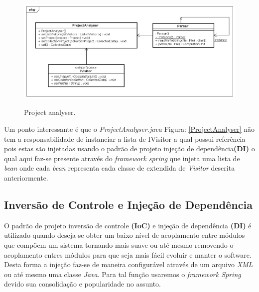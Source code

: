 \begin{figure}[h]
	\center
	\includegraphics[scale=0.4]{Imagens/ProjectAnalyser}
	\label{fig:ProjectAnalyser}
	\caption{Project analyser.}
\end{figure}


Um ponto interessante é que o \textit{ProjectAnalyser.java} Figura: \ref{ProjectAnalyser} não tem a responsabilidade de instanciar a lista de IVisitor a qual possui referência pois estas são injetadas usando o padrão de projeto injeção de dependência\textbf{(DI)} o qual aqui faz-se presente através do {\it framework spring} que injeta uma lista de \textit{bean} onde cada \textit{bean} representa cada classe de extendida de {\it Visitor} descrita anteriormente.\\



\subsection{Inversão de Controle e Injeção de Dependência}
O padrão de projeto inversão de controle \textbf{(IoC)} e injeção de dependência \textbf{(DI)} é utilizado quando deseja-se obter um baixo nível de acoplamento entre módulos que compõem um sistema tornando mais suave ou até mesmo removendo o acoplamento entres módulos para que seja mais fácil evoluir e manter o software. Desta forma a injeção faz-se de maneira configurável através de um arquivo \textit{XML} ou até mesmo uma classe \textit{Java}. Para tal função usaremos o {\it framework Spring} devido sua consolidação e popularidade no assunto.\\

